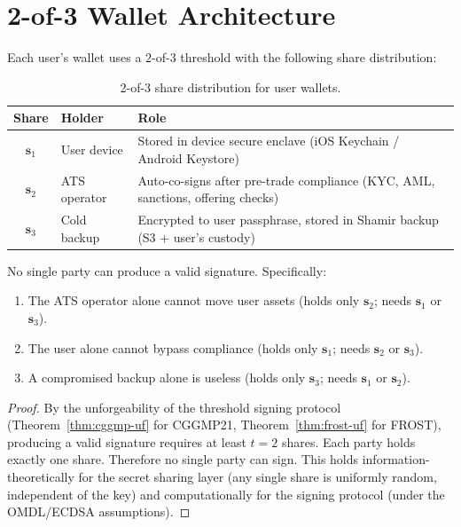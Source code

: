 \section{2-of-3 Wallet Architecture}

\label{sec:wallet}

Each user's wallet uses a $2$-of-$3$ threshold with the following share
distribution:

\begin{table}[h]
\centering
\begin{tabular}{clp{7.5cm}}
\toprule
\textbf{Share} & \textbf{Holder} & \textbf{Role} \\
\midrule
$\mathbf{s}_1$ & User device & Stored in device secure enclave
  (iOS Keychain / Android Keystore) \\
$\mathbf{s}_2$ & ATS operator & Auto-co-signs after pre-trade compliance
  (KYC, AML, sanctions, offering checks) \\
$\mathbf{s}_3$ & Cold backup & Encrypted to user passphrase, stored in
  Shamir backup (S3 + user's custody) \\
\bottomrule
\end{tabular}
\caption{2-of-3 share distribution for user wallets.}
\label{tab:shares}
\end{table}

\begin{theorem}
\label{thm:non-custodial}
No single party can produce a valid signature.  Specifically:
\begin{enumerate}[nosep]
  \item The ATS operator alone cannot move user assets (holds only
        $\mathbf{s}_2$; needs $\mathbf{s}_1$ or $\mathbf{s}_3$).
  \item The user alone cannot bypass compliance (holds only
        $\mathbf{s}_1$; needs $\mathbf{s}_2$ or $\mathbf{s}_3$).
  \item A compromised backup alone is useless (holds only
        $\mathbf{s}_3$; needs $\mathbf{s}_1$ or $\mathbf{s}_2$).
\end{enumerate}
\end{theorem}

\begin{proof}
By the unforgeability of the threshold signing protocol
(Theorem~\ref{thm:cggmp-uf} for CGGMP21,
Theorem~\ref{thm:frost-uf} for FROST), producing a valid signature
requires at least $t = 2$ shares.  Each party holds exactly one share.
Therefore no single party can sign.  This holds information-theoretically
for the secret sharing layer (any single share is uniformly random,
independent of the key) and computationally for the signing protocol
(under the OMDL/ECDSA assumptions).
\end{proof}

